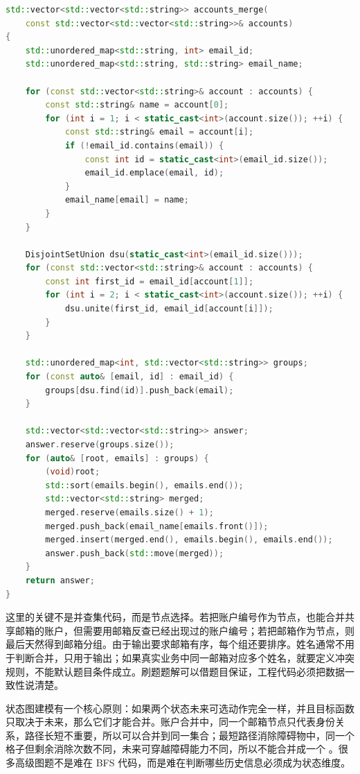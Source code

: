 \begin{lstlisting}[language=C++,caption={LeetCode 721 账户合并：把邮箱映射为并查集节点}]
std::vector<std::vector<std::string>> accounts_merge(
    const std::vector<std::vector<std::string>>& accounts)
{
    std::unordered_map<std::string, int> email_id;
    std::unordered_map<std::string, std::string> email_name;

    for (const std::vector<std::string>& account : accounts) {
        const std::string& name = account[0];
        for (int i = 1; i < static_cast<int>(account.size()); ++i) {
            const std::string& email = account[i];
            if (!email_id.contains(email)) {
                const int id = static_cast<int>(email_id.size());
                email_id.emplace(email, id);
            }
            email_name[email] = name;
        }
    }

    DisjointSetUnion dsu(static_cast<int>(email_id.size()));
    for (const std::vector<std::string>& account : accounts) {
        const int first_id = email_id[account[1]];
        for (int i = 2; i < static_cast<int>(account.size()); ++i) {
            dsu.unite(first_id, email_id[account[i]]);
        }
    }

    std::unordered_map<int, std::vector<std::string>> groups;
    for (const auto& [email, id] : email_id) {
        groups[dsu.find(id)].push_back(email);
    }

    std::vector<std::vector<std::string>> answer;
    answer.reserve(groups.size());
    for (auto& [root, emails] : groups) {
        (void)root;
        std::sort(emails.begin(), emails.end());
        std::vector<std::string> merged;
        merged.reserve(emails.size() + 1);
        merged.push_back(email_name[emails.front()]);
        merged.insert(merged.end(), emails.begin(), emails.end());
        answer.push_back(std::move(merged));
    }
    return answer;
}
\end{lstlisting}

这里的关键不是并查集代码，而是节点选择。若把账户编号作为节点，也能合并共享邮箱的账户，但需要用邮箱反查已经出现过的账户编号；若把邮箱作为节点，则最后天然得到邮箱分组。由于输出要求邮箱有序，每个组还要排序。姓名通常不用于判断合并，只用于输出；如果真实业务中同一邮箱对应多个姓名，就要定义冲突规则，不能默认题目条件成立。刷题题解可以借题目保证，工程代码必须把数据一致性说清楚。

状态图建模有一个核心原则：如果两个状态未来可选动作完全一样，并且目标函数只取决于未来，那么它们才能合并。账户合并中，同一个邮箱节点只代表身份关系，路径长短不重要，所以可以合并到同一集合；最短路径消除障碍物中，同一个格子但剩余消除次数不同，未来可穿越障碍能力不同，所以不能合并成一个 。很多高级图题不是难在 BFS 代码，而是难在判断哪些历史信息必须成为状态维度。

